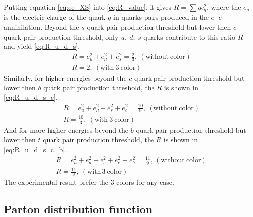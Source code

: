 Putting equation \ref{eq:ee_XS} into \ref{eq:R_value}, it gives $R=\sum{q}e_{q}^{2}$, where the $e_{q}$ is the electric charge of the quark $q$ in quarks pairs produced in the $e^{+}e^{-}$ annihilation. Beyond the $s$ quark pair production threshold but lower then $c$ quark pair production threshold, only $u,~d,~s$ quarks contribute to this ratio $R$ and yield \ref{eq:R_u_d_s}.
\begin{equation}
\begin{split}
&R=e_{u}^{2}+e_{d}^{2}+e_{s}^{2}=\frac{2}{3},~\mathrm{(without~color)} \\
&R=2,~\mathrm{(with~3~color)}
\end{split}
\label{eq:R_u_d_s}
\end{equation}
Similarly, for higher energies beyond the $c$ quark pair production threshold but lower then $b$ quark pair production threshold, the $R$ is shown in \ref{eq:R_u_d_s_c}.
\begin{equation}
\begin{split}
&R=e_{u}^{2}+e_{d}^{2}+e_{s}^{2}+e_{c}^{2}=\frac{10}{9},~\mathrm{(without~color)} \\
&R=\frac{10}{3},~\mathrm{(with~3~color)}
\end{split}
\label{eq:R_u_d_s_c}
\end{equation}
And for more higher energies beyond the $b$ quark pair production threshold but lower then $t$ quark pair production threshold, the $R$ is shown in \ref{eq:R_u_d_s_c_b}.
\begin{equation}
\begin{split}
&R=e_{u}^{2}+e_{d}^{2}+e_{s}^{2}+e_{c}^{2}+e_{b}^{2}=\frac{11}{9},~\mathrm{(without~color)} \\
&R=\frac{11}{3},~\mathrm{(with~3~color)}
\end{split}
\label{eq:R_u_d_s_c_b}
\end{equation}
The experimental result prefer the 3 colors for any case.
\subsection{Parton distribution function}\label{subsec:pdf}

